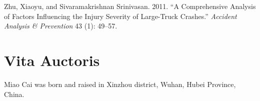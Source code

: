 \documentclass[12pt]{book}
\numberwithin{equation}{chapter}
\begin{document}
\leavevmode\hypertarget{ref-zhu2011comprehensive}{}%
Zhu, Xiaoyu, and Sivaramakrishnan Srinivasan. 2011. ``A Comprehensive Analysis of Factors Influencing the Injury Severity of Large-Truck Crashes.'' \emph{Accident Analysis \& Prevention} 43 (1): 49--57.

\hypertarget{vita-auctoris}{%
\chapter*{Vita Auctoris}\label{vita-auctoris}}

Miao Cai was born and raised in Xinzhou district, Wuhan, Hubei Province, China.







\backmatter
\printindex
\end{document}
